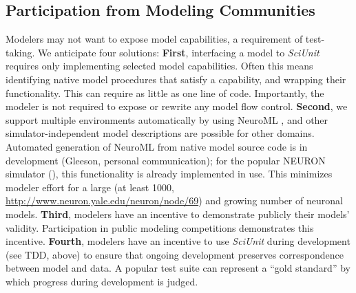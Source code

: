\documentclass{frontiersSCNS}
\begin{document}
\subsection{Participation from Modeling Communities}
Modelers may not want to expose model capabilities, a requirement of test-taking.  
We anticipate four solutions: \textbf{First}, interfacing a model to \textit{SciUnit} requires only implementing selected model capabilities. 
Often this means identifying native model procedures that satisfy a capability, and wrapping their functionality. 
This can require as little as one line of code. 
Importantly, the modeler is not required to expose or rewrite any model flow control. 
\textbf{Second}, we support multiple environments automatically by using NeuroML \citep{gleeson_neuroml:_2010}, and other simulator-independent model descriptions are possible for other domains. 
Automated generation of NeuroML from native model source code is in development (Gleeson, personal communication); for the popular NEURON simulator (\cite{carnevale_neuron_2006}), this functionality is already implemented in use. 
This minimizes modeler effort for a large (at least 1000, \url{http://www.neuron.yale.edu/neuron/node/69}) and growing number of neuronal models. 
\textbf{Third}, modelers have an incentive to demonstrate publicly their models' validity. 
Participation in public modeling competitions demonstrates this incentive. 
\textbf{Fourth}, modelers have an incentive to use \textit{SciUnit} during development (see TDD, above) to ensure that ongoing development preserves correspondence between model and data. 
A popular test suite can represent a ``gold standard'' by which progress during development is judged.
\end{document}
